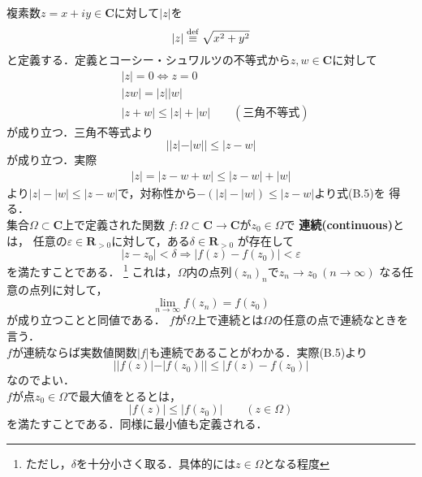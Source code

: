 
\noindent
複素数$z = x + iy\in \mathbf{C}$に対して$|z|$を
\begin{equation}
  |z| \stackrel{\mathrm{def}}{\equiv} \sqrt{x^{2} + y^{2}}
\end{equation}
と定義する．定義とコーシー・シュワルツの不等式から$z,w\in \mathbf{C}$に対して
\begin{align}
  &|z| = 0 \Leftrightarrow z = 0\\
  &|zw| = |z||w|\\
  &|z + w| \leq |z| + |w|\qquad (三角不等式)
\end{align}
が成り立つ．三角不等式より
\begin{equation}
  ||z|-|w|| \leq |z - w|
\end{equation}
が成り立つ．実際
\begin{align*}
  |z| = |z - w + w| \leq |z - w| + |w| 
\end{align*}
より$|z| - |w| \leq |z - w|$で，対称性から$-(|z| - |w|) \leq |z-w|$より式(B.5)を
得る．\\
集合$\Omega \subset \mathbf{C}$上で定義された関数
$f:\Omega \subset \mathbf{C} \to \mathbf{C}$が$z_{0}\in \Omega$で
\textbf{連続(continuous)}とは，
任意の$\varepsilon \in \mathbf{R}_{>0}$に対して，ある$\delta \in \mathbf{R}_{>0}$
が存在して
\begin{equation}
  |z - z_{0}| < \delta \Rightarrow |f(z) - f(z_{0})| < \varepsilon
\end{equation}
を満たすことである．
\footnote{ただし，$\delta$を十分小さく取る．具体的には$z\in \Omega$となる程度}
これは，$\Omega$内の点列$(z_{n})_{n}$で$z_{n} \to z_{0}\ (n \to \infty)$
なる任意の点列に対して，
\begin{equation}
  \lim_{n \to \infty}f(z_{n}) = f(z_{0})
\end{equation}
が成り立つことと同値である．
$f$が$\Omega$上で連続とは$\Omega$の任意の点で連続なときを言う．\\
$f$が連続ならば実数値関数$|f|$も連続であることがわかる．実際(B.5)より
\begin{equation}
  ||f(z)| - |f(z_{0})|| \leq |f(z) - f(z_{0})|
\end{equation}
なのでよい．\\
$f$が点$z_{0}\in \Omega$で最大値をとるとは，
\begin{equation*}
  |f(z)| \leq |f(z_{0})| \qquad (z\in \Omega)
\end{equation*}
を満たすことである．同様に最小値も定義される．


